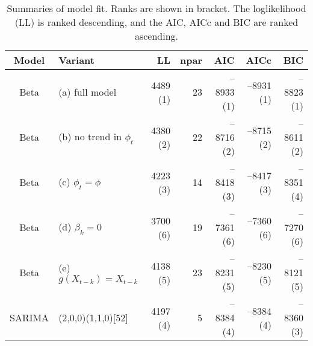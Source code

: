 \begin{table}[ht]
\centering
\begin{tabular}{cl|rrrrr}
  \hline
Model & Variant & LL & npar & AIC & AICc & BIC \\ 
  \hline
Beta & (a) full model & 4489 (1) & 23 & --8933 (1) & --8931 (1) & --8823 (1) \\ 
  Beta & (b) no trend in $\phi_t$ & 4380 (2) & 22 & --8716 (2) & --8715 (2) & --8611 (2) \\ 
  Beta & (c) $\phi_t = \phi$ & 4223 (3) & 14 & --8418 (3) & --8417 (3) & --8351 (4) \\ 
  Beta & (d) $\beta_k = 0$ & 3700 (6) & 19 & --7361 (6) & --7360 (6) & --7270 (6) \\ 
  Beta & (e) $g(X_{t-k}) = X_{t-k}$ & 4138 (5) & 23 & --8231 (5) & --8230 (5) & --8121 (5) \\ 
   \hline
SARIMA & (2,0,0)(1,1,0)[52] & 4197 (4) & 5 & --8384 (4) & --8384 (4) & --8360 (3) \\ 
   \hline
\end{tabular}
\caption{Summaries of model fit.
             Ranks are shown in bracket.
             The loglikelihood (LL) is ranked descending,
             and the AIC, AICc and BIC are ranked ascending.} 
\label{tab:wILIsum}
\end{table}
